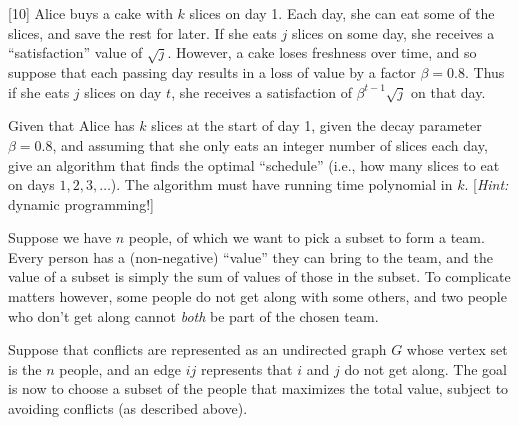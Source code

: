 \documentclass[addpoints]{exam}
\begin{document}
\begin{questions}
  [10]
  Alice buys a cake with $k$ slices on day 1. Each day, she can eat some of the slices, and save the rest for later. If she eats $j$ slices on some day, she receives a ``satisfaction'' value of $\sqrt{j}$. However, a cake loses freshness over time, and so suppose that each passing day results in a loss of value by a factor $\beta = 0.8$. Thus if she eats $j$ slices on day $t$, she receives a satisfaction of $\beta^{t-1} \sqrt{j}$ on that day.

  Given that Alice has $k$ slices at the start of day 1, given the decay parameter $\beta = 0.8$, and assuming that she only eats an integer number of slices each day, give an algorithm that finds the optimal ``schedule'' (i.e., how many slices to eat on days $1, 2, 3, \dots$). The algorithm must have running time polynomial in $k$.   [{\em Hint: } dynamic programming!]

  Suppose we have $n$ people, of which we want to pick a subset to form a team. Every person has a (non-negative) ``value'' they can bring to the team, and the value of a subset is simply the sum of values of those in the subset. To complicate matters however, some people do not get along with some others, and two people who don't get along cannot {\em both} be part of the chosen team.

  Suppose that conflicts are represented as an undirected graph $G$ whose vertex set is the $n$ people, and an edge $ij$ represents that $i$ and $j$ do not get along. The goal is now to choose a subset of the people that maximizes the total value, subject to avoiding conflicts (as described above).

\end{questions}
\end{document}
